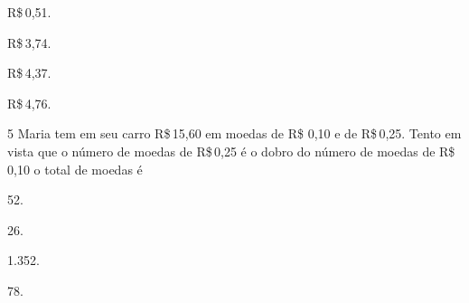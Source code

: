 \begin{multicols}{2}
\begin{escolha}
\item R\$\,0,51.
\item R\$\,3,74.
\item R\$\,4,37.
\item R\$\,4,76.
\end{escolha}
\end{multicols}













\num{5} Maria tem em seu carro R\$\,15,60 em moedas de R\$ 0,10 e de R\$\,0,25.
Tento em vista que o número de moedas de R\$\,0,25 é o dobro do número
de moedas de R\$ 0,10 o total de moedas é

\begin{escolha}
\item 52.
\item 26.
\item 1.352.
\item 78.
\end{escolha}




